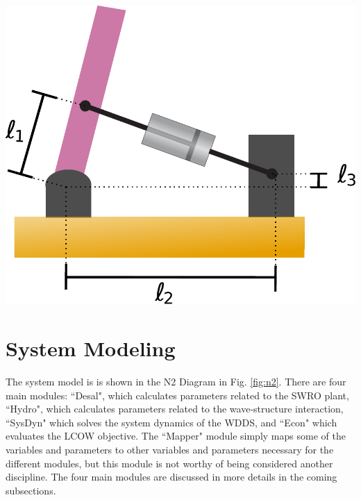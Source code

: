 \documentclass[twocolumn,10pt]{asme2e}
\begin{document}
\begin{center}
    \includegraphics[width=0.8\linewidth]{../figs/mechanism.pdf}
    \label{fig:mechanism}
\end{center}

\section{System Modeling}
The system model is is shown in the N2 Diagram in Fig. \ref{fig:n2}. There are four main modules: ``Desal", which calculates parameters related to the SWRO plant, ``Hydro", which calculates parameters related to the wave-structure interaction, ``SysDyn" which solves the system dynamics of the WDDS, and ``Econ" which evaluates the LCOW objective. The ``Mapper" module simply maps some of the variables and parameters to  other variables and parameters necessary for the different modules, but this module is not worthy of being considered another discipline. The four main modules are discussed in more details in the coming subsections. 
\end{document}
